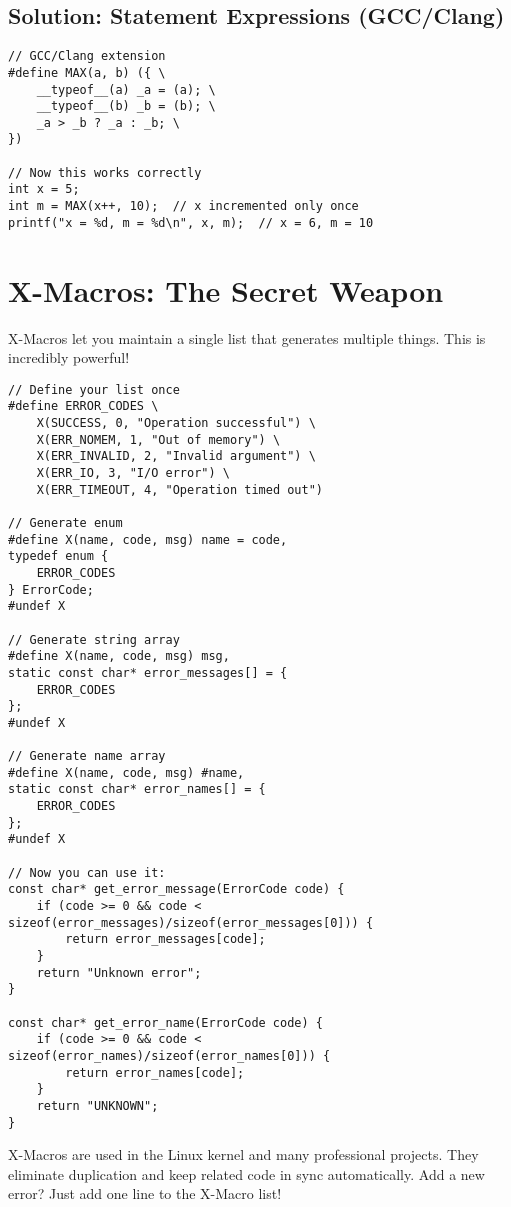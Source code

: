 \subsection{Solution: Statement Expressions (GCC/Clang)}

\begin{lstlisting}
// GCC/Clang extension
#define MAX(a, b) ({ \
    __typeof__(a) _a = (a); \
    __typeof__(b) _b = (b); \
    _a > _b ? _a : _b; \
})

// Now this works correctly
int x = 5;
int m = MAX(x++, 10);  // x incremented only once
printf("x = %d, m = %d\n", x, m);  // x = 6, m = 10
\end{lstlisting}

\section{X-Macros: The Secret Weapon}

X-Macros let you maintain a single list that generates multiple things. This is incredibly powerful!

\begin{lstlisting}
// Define your list once
#define ERROR_CODES \
    X(SUCCESS, 0, "Operation successful") \
    X(ERR_NOMEM, 1, "Out of memory") \
    X(ERR_INVALID, 2, "Invalid argument") \
    X(ERR_IO, 3, "I/O error") \
    X(ERR_TIMEOUT, 4, "Operation timed out")

// Generate enum
#define X(name, code, msg) name = code,
typedef enum {
    ERROR_CODES
} ErrorCode;
#undef X

// Generate string array
#define X(name, code, msg) msg,
static const char* error_messages[] = {
    ERROR_CODES
};
#undef X

// Generate name array
#define X(name, code, msg) #name,
static const char* error_names[] = {
    ERROR_CODES
};
#undef X

// Now you can use it:
const char* get_error_message(ErrorCode code) {
    if (code >= 0 && code < sizeof(error_messages)/sizeof(error_messages[0])) {
        return error_messages[code];
    }
    return "Unknown error";
}

const char* get_error_name(ErrorCode code) {
    if (code >= 0 && code < sizeof(error_names)/sizeof(error_names[0])) {
        return error_names[code];
    }
    return "UNKNOWN";
}
\end{lstlisting}

\begin{tipbox}
X-Macros are used in the Linux kernel and many professional projects. They eliminate duplication and keep related code in sync automatically. Add a new error? Just add one line to the X-Macro list!
\end{tipbox}

